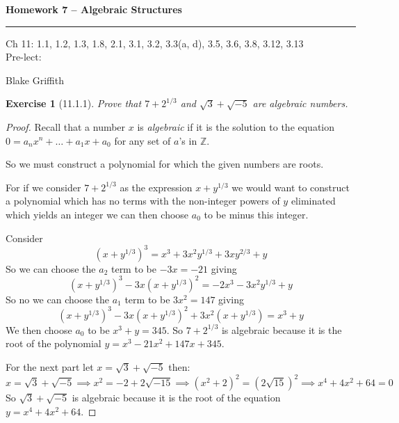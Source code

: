 \documentclass[12pt]{article}
\newtheorem*{exer}{Exercise}
\begin{document}
\textbf{Homework 7 -- Algebraic Structures} \\

\hrule

\begin{minipage}{.80\linewidth}
    \flushleft
    Ch 11: 1.1, 1.2, 1.3, 1.8, 2.1, 3.1, 3.2, 3.3(a, d), 3.5, 3.6, 3.8,
    3.12, 3.13 \\
    Pre-lect:  \\
\end{minipage}
\begin{minipage}{.20\linewidth}
    \flushright
    Blake Griffith
\end{minipage}


\begin{exer}[11.1.1]

    Prove that $7 + 2^{1/3}$ and $\sqrt{3} + \sqrt{-5}$ are algebraic
    numbers.

\end{exer}

\begin{proof}

    Recall that a number $x$ is \textit{algebraic} if it is the solution
    to the equation $0 = a_n x^n + \dots + a_1 x + a_0$ for any set of
    $a$'s in $\mathbb{Z}$.

    So we must construct a polynomial for which the given numbers are
    roots. 

    For if we consider $7 + 2^{1/3}$ as the expression $x + y^{1/3}$ we
    would want to construct a polynomial which has no terms with the
    non-integer powers of $y$ eliminated which yields an integer we can
    then choose $a_0$ to be minus this integer.

    Consider 
    \[
        (x + y^{1/3})^3 = x^3 + 3x^2y^{1/3} + 3xy^{2/3} + y
    \]
    So we can choose the $a_2$ term to be $-3x = -21$ giving
    \[
        (x + y^{1/3})^3 - 3x(x + y^{1/3})^2 = -2x^3 - 3x^2y^{1/3} + y
    \]
    So no we can choose the $a_1$ term to be $3x^2 = 147$ giving
    \[
        (x + y^{1/3})^3 - 3x(x + y^{1/3})^2 + 3x^2(x + y^{1/3}) = x^3 +
        y
    \]
    We then choose $a_0$ to be $x^3 + y = 345$. So $7 + 2^{1/3}$ is
    algebraic because it is the root of the polynomial $y = x^3 - 21x^2
    + 147x + 345$.

    For the next part let $x = \sqrt{3} + \sqrt{-5}$ then:
    \[
        x = \sqrt{3} + \sqrt{-5} \implies x^2 = -2 + 2\sqrt{-15}
        \implies (x^2 + 2)^2 = (2\sqrt{15})^2 \implies x^4 + 4x^2 + 64 =
        0
    \]
    So $\sqrt{3} + \sqrt{-5}$ is algebraic because it is the root of the
    equation $y = x^4 + 4x^2 + 64$.

\end{proof}
\end{document}
